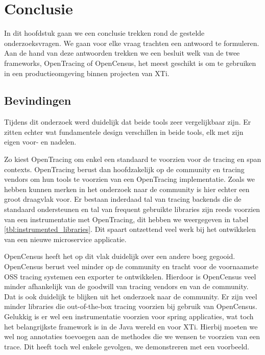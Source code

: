 
\chapter{Conclusie}
\label{ch:conclusie}

In dit hoofdstuk gaan we een conclusie trekken rond de gestelde onderzoeksvragen. We gaan voor elke vraag trachten een antwoord te formuleren. Aan de hand van deze antwoorden trekken we een besluit welk van de twee frameworks, OpenTracing of OpenCensus, het meest geschikt is om te gebruiken in een productieomgeving binnen projecten van XTi.

\section{Bevindingen}
Tijdens dit onderzoek werd duidelijk dat beide tools zeer vergelijkbaar zijn. Er zitten echter wat fundamentele design verschillen in beide tools, elk met zijn eigen voor- en nadelen.

Zo kiest OpenTracing om enkel een standaard te voorzien voor de tracing en span contexts. OpenTracing berust dan hoofdzakelijk op de community en tracing vendors om hun tools te voorzien van een OpenTracing implementatie. Zoals we hebben kunnen merken in het onderzoek naar de community is hier echter een groot draagvlak voor. Er bestaan inderdaad tal van tracing backends die de standaard ondersteunen en tal van frequent gebruikte libraries zijn reeds voorzien van een instrumentatie met OpenTracing, dit hebben we weergegeven in tabel \ref{tbl:instrumented_libraries}. Dit spaart ontzettend veel werk bij het ontwikkelen van een nieuwe microservice applicatie.

OpenCensus heeft het op dit vlak duidelijk over een andere boeg gegooid. OpenCensus berust veel minder op de community en tracht voor de voornaamste \gls{OSS} tracing systemen een exporter te ontwikkelen. Hierdoor is OpenCensus veel minder afhankelijk van de goodwill van tracing vendors en van de community. Dat is ook duidelijk te blijken uit het onderzoek naar de community. Er zijn veel minder libraries die out-of-the-box tracing voorzien bij gebruik van OpenCensus. Gelukkig is er wel een instrumentatie voorzien voor spring applicaties, wat toch het belangrijkste framework is in de Java wereld en voor XTi. Hierbij moeten we wel nog annotaties toevoegen aan de methodes die we wensen te voorzien van een trace. Dit heeft toch wel enkele gevolgen, we demonstreren met een voorbeeld.

